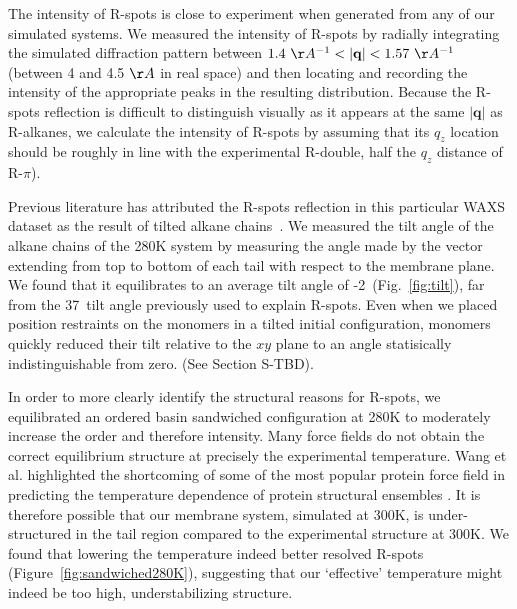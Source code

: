 \documentclass[journal=jpcbfk,manuscript=article]{achemso}
\begin{document}
  The intensity of R-spots is close to experiment when generated from any of
  our simulated systems. We measured the intensity of R-spots by radially integrating the simulated
  diffraction pattern between $1.4~\AA^{-1} < |\mathbf{q}| < 1.57~\AA^{-1}$
  (between 4 and 4.5 $\AA$ in real space) and then locating and recording the
  intensity of the appropriate peaks in the resulting distribution. Because the
  R-spots reflection is difficult to distinguish visually as it appears at the
  same $|\mathbf{q}|$ as R-alkanes, we calculate the intensity of R-spots by
  assuming that its $q_z$ location should be roughly in line with the
  experimental R-double, half the $q_z$ distance of R-$\pi$).

  Previous literature has attributed the R-spots reflection in this particular
  WAXS dataset as the result of tilted alkane chains~\cite{feng_scalable_2014}.
  We measured the tilt angle of the alkane chains of the 280K system by measuring
  the angle made by the vector extending from top to bottom of each tail with
  respect to the membrane plane. We found that it equilibrates to an average tilt
  angle of -2\degree~(Fig.~\ref{fig:tilt}), far from the 37\degree~tilt angle
  previously used to explain R-spots. Even when we placed position restraints on
  the monomers in a tilted initial configuration, monomers quickly reduced their
  tilt relative to the $xy$ plane to an angle statisically indistinguishable from
  zero. (See Section S-TBD). 

  In order to more clearly identify the structural reasons for R-spots, we
  equilibrated an ordered basin sandwiched configuration at 280K to moderately
  increase the order and therefore intensity.  Many force fields do not obtain
  the correct equilibrium structure at precisely the experimental temperature.
  Wang et al. highlighted the shortcoming of some of the most popular protein
  force field in predicting the temperature dependence of protein structural
  ensembles \cite{wang_building_2017}. It is therefore possible that   %
  our membrane system, simulated at 300K, is under-structured in the tail region
  compared to the experimental structure at 300K. We found that lowering the
  temperature indeed better resolved R-spots (Figure~\ref{fig:sandwiched280K}),
  suggesting that our `effective' temperature might indeed be too high,
  understabilizing structure. 
\end{document}
